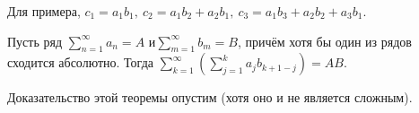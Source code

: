 \documentclass[a4paper, 12pt]{article}
\begin{document}
	Для примера, $c_1 = a_1b_1,\ c_2 = a_1b_2 + a_2b_1,\ c_3 = a_1b_3+a_2b_2+a_3b_1$.
	
	\begin{Theorem}[Мертенса]
		Пусть ряд $\sum\limits_{n=1}^{\infty}a_n = A $ и$ \sum\limits_{m=1}^{\infty}b_m = B$, причём хотя бы один из рядов сходится абсолютно. Тогда $\sum\limits_{k=1}^{\infty}\left(\sum\limits_{j=1}^{k}a_jb_{k+1-j}\right) = AB.$
	\end{Theorem}
	
	Доказательство этой теоремы опустим (хотя оно и не является сложным).
\end{document}
